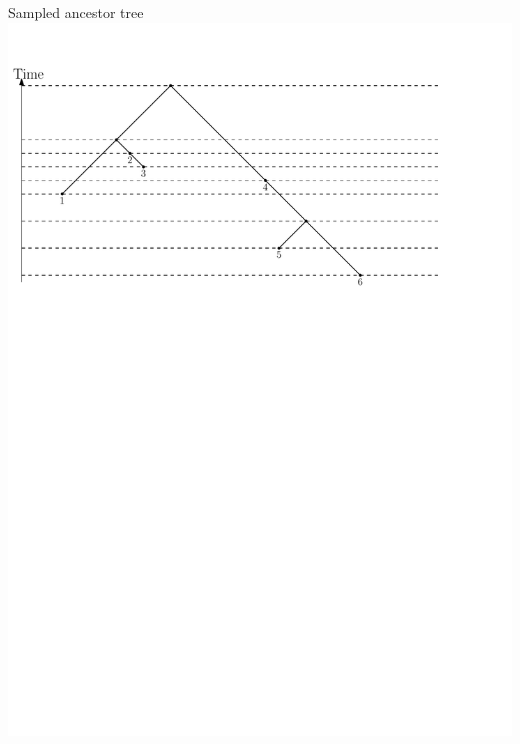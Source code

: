 \documentclass{beamer}
\theoremstyle{example}
\begin{document}
\begin{frame}
\begin{block}{Sampled ancestor tree}
\includegraphics[width=\framewidth]{SampledAncestorTree}
\end{block}
\end{frame}
\end{document}
